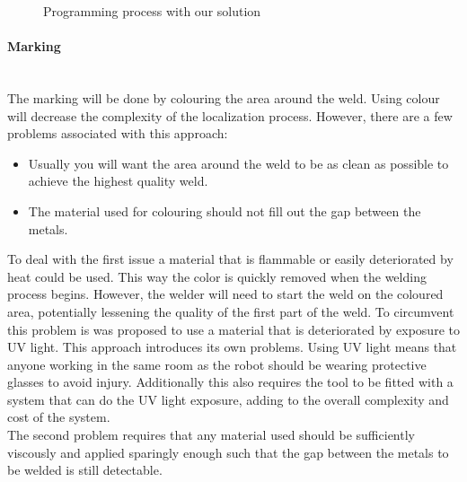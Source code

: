 \begin{figure}[h]
\centering
{}
\caption{Programming process with our solution}
\label{programming_state_diagram}
\end{figure}

\paragraph*{Marking}~\\
The marking will be done by colouring the area around the weld. 
Using colour will decrease the complexity of the localization process. 
However, there are a few problems associated with this approach: 
\begin{itemize}
	\item Usually you will want the area around the weld to be as clean as possible to achieve the highest quality weld.
	\item The material used for colouring should not fill out the gap between the metals.
\end{itemize}
To deal with the first issue a material that is flammable or easily deteriorated by heat could be used. 
This way the color is quickly removed when the welding process begins. 
However, the welder will need to start the weld on the coloured area, potentially lessening the quality of the first part of the weld. 
To circumvent this problem is was proposed to use a material that is deteriorated by exposure to UV light. 
This approach introduces its own problems. 
Using UV light means that anyone working in the same room as the robot should be wearing protective glasses to avoid injury. 
Additionally this also requires the tool to be fitted with a system that can do the UV light exposure, adding to the overall complexity and cost of the system.\\
The second problem requires that any material used should be sufficiently viscously and applied sparingly enough such that the gap between the metals to be welded is still detectable.

